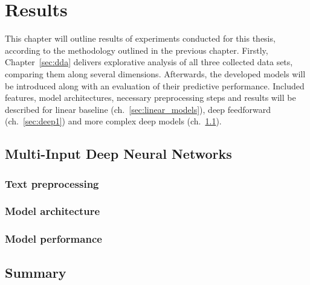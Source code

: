 \section{Results}
\label{ch:results}

This chapter will outline results of experiments conducted for this thesis,
according to the methodology outlined in the previous chapter.
Firstly, Chapter~\ref{sec:dda} delivers explorative analysis of all three
collected data sets, comparing them along several dimensions.
Afterwards, the developed models will be introduced along with an evaluation
of their predictive performance.
Included features, model architectures, necessary preprocessing steps and results will
be described for linear baseline (ch.~\ref{sec:linear_models}),
deep feedforward (ch.~\ref{sec:deep1}) and more complex deep models
(ch.~\ref{sec:deep_combined}).







\subsection{Multi-Input Deep Neural Networks}
\label{sec:deep_combined}

\subsubsection{Text preprocessing}
\label{sub:text_preprocess}

\subsubsection{Model architecture}
\label{sub:model_architecture}

\subsubsection{Model performance}
\label{sub:comb_performance}

\subsection{Summary}
\label{sec:res_summary}
